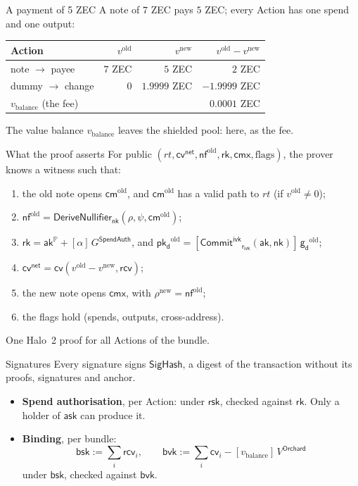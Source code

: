 \documentclass[aspectratio=169,11pt]{beamer}
\newcommand{\nfsym}{\ensuremath{\mathsf{nf}}}
\newcommand{\cmsym}{\ensuremath{\mathsf{cm}}}
\newcommand{\cmx}{\ensuremath{\mathsf{cmx}}}
\newcommand{\cvsym}{\ensuremath{\mathsf{cv}}}
\newcommand{\rksym}{\ensuremath{\mathsf{rk}}}
\newcommand{\gd}{\ensuremath{\mathsf{g_d}}}
\newcommand{\pkd}{\ensuremath{\mathsf{pk_d}}}
\newcommand{\aksym}{\ensuremath{\mathsf{ak}}}
\newcommand{\nksym}{\ensuremath{\mathsf{nk}}}
\newcommand{\asksym}{\ensuremath{\mathsf{ask}}}
\newcommand{\rcv}{\ensuremath{\mathsf{rcv}}}
\newcommand{\rivk}{\ensuremath{\mathsf{r_{ivk}}}}
\newcommand{\rsk}{\ensuremath{\mathsf{rsk}}}
\newcommand{\CommitIvk}{\ensuremath{\mathsf{Commit}^{\mathsf{ivk}}}}
\newcommand{\vbal}{\ensuremath{v_{\mathrm{balance}}}}
\newcommand{\PP}{\mathbb{P}}
\newcommand{\akP}{\aksym^{\PP}}
\newcommand{\rk}{\rksym}
\newcommand{\DNf}{\mathsf{DeriveNullifier}}
\newcommand{\VO}{V^{\mathsf{Orchard}}}
\newcommand{\GS}{G^{\mathsf{SpendAuth}}}
\newcommand{\cvnet}{\cvsym^{\mathsf{net}}}
\begin{document}
\begin{frame}{A payment of 5 ZEC}
A note of $7$ ZEC pays $5$ ZEC; every Action has one spend and one output:
\vfill
\begin{center}
\begin{tabular}{@{}lrrr@{}}
\toprule
Action & $v^{\mathrm{old}}$ & $v^{\mathrm{new}}$ & $v^{\mathrm{old}} - v^{\mathrm{new}}$ \\
\midrule
note $\to$ payee & $7$ ZEC & $5$ ZEC & $2$ ZEC \\
dummy $\to$ change & $0$ & $1.9999$ ZEC & $-1.9999$ ZEC \\
\midrule
$\vbal$ (the fee) & & & $0.0001$ ZEC \\
\bottomrule
\end{tabular}
\end{center}
\vfill
The value balance $\vbal$ leaves the shielded pool: here, as the fee.
\end{frame}

\begin{frame}{What the proof asserts}
For public $(\mathit{rt}, \cvnet, \nfsym^{\mathrm{old}}, \rk, \cmx,
\text{flags})$,
the prover knows a witness such that:
\begin{enumerate}\itemsep3pt
\item the old note opens $\cmsym^{\mathrm{old}}$, and $\cmsym^{\mathrm{old}}$
  has a valid path to $\mathit{rt}$ (if $v^{\mathrm{old}} \ne 0$);
\item $\nfsym^{\mathrm{old}} = \DNf_{\nksym}(\rho, \psi,
  \cmsym^{\mathrm{old}})$;
\item $\rk = \akP + [\alpha]\,\GS$, and $\pkd^{\mathrm{old}} =
  [\CommitIvk_{\rivk}(\aksym, \nksym)]\,\gd^{\mathrm{old}}$;
\item $\cvnet = \cvsym(v^{\mathrm{old}} - v^{\mathrm{new}}, \rcv)$;
\item the new note opens $\cmx$, with $\rho^{\mathrm{new}} =
  \nfsym^{\mathrm{old}}$;
\item the flags hold (spends, outputs, cross-address).
\end{enumerate}
\vfill
One Halo~2 proof for all Actions of the bundle.
\end{frame}

\begin{frame}{Signatures}
Every signature signs $\mathsf{SigHash}$, a digest of the transaction
without its proofs, signatures and anchor.
\vfill
\begin{itemize}\itemsep8pt
\item \textbf{Spend authorisation}, per Action: under $\rsk$, checked
  against $\rk$. Only a holder of $\asksym$ can produce it.
\item \textbf{Binding}, per bundle:
\[
\mathsf{bsk} := \sum_i \rcv_i, \qquad
\mathsf{bvk} := \sum_i \cvsym_i - [\vbal]\,\VO
\]
  under $\mathsf{bsk}$, checked against $\mathsf{bvk}$.
\end{itemize}
\end{frame}
\end{document}
